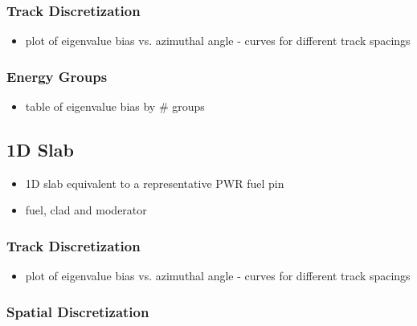 \subsubsection{Track Discretization}
\label{subsubsec:chap4-inf-medium-tracks}

\begin{itemize}
  \item plot of eigenvalue bias vs. azimuthal angle - curves for different track spacings
\end{itemize}

\subsubsection{Energy Groups}
\label{subsubsec:chap4-inf-medium-energy}

\begin{itemize}
  \item table of eigenvalue bias by \# groups
\end{itemize}


\subsection{1D Slab}
\label{subsec:chap4-slab}

\begin{itemize}
  \item 1D slab equivalent to a representative \ac{PWR} fuel pin
  \item fuel, clad and moderator
\end{itemize}

\subsubsection{Track Discretization}
\label{subsubsec:chap4-slab-tracks}

\begin{itemize}
  \item plot of eigenvalue bias vs. azimuthal angle - curves for different track spacings
\end{itemize}

\subsubsection{Spatial Discretization}
\label{subsubsec:chap4-slab-space}


